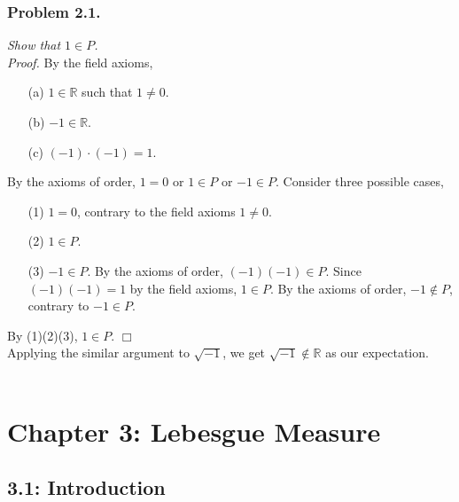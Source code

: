 \documentclass{article}
\begin{document}
\subsubsection*{Problem 2.1.}
\emph{Show that $1 \in P$.} \\

\emph{Proof.}
By the field axioms,
\begin{enumerate}
\item[(a)]
$1 \in \mathbb{R}$ such that $1 \neq 0$.
\item[(b)]
$-1 \in \mathbb{R}$.
\item[(c)]
$(-1) \cdot (-1) = 1$.
\end{enumerate}

By the axioms of order,
$1 = 0$ or $1 \in P$ or $-1 \in P$.
Consider three possible cases,
\begin{enumerate}
\item[(1)]
$1 = 0$, contrary to the field axioms $1 \neq 0$.
\item[(2)]
$1 \in P$.
\item[(3)]
$-1 \in P$.
By the axioms of order, $(-1)(-1) \in P$.
Since $(-1)(-1) = 1$ by the field axioms, $1 \in P$.
By the axioms of order, $-1 \not\in P$, contrary to $-1 \in P$.
\end{enumerate}
By (1)(2)(3), $1 \in P$.
$\Box$ \\

Applying the similar argument to $\sqrt{-1}$,
we get $\sqrt{-1} \not\in \mathbb{R}$
as our expectation. \\\\






\newpage
\section*{Chapter 3: Lebesgue Measure \\}



\subsection*{3.1: Introduction \\}
\end{document}
